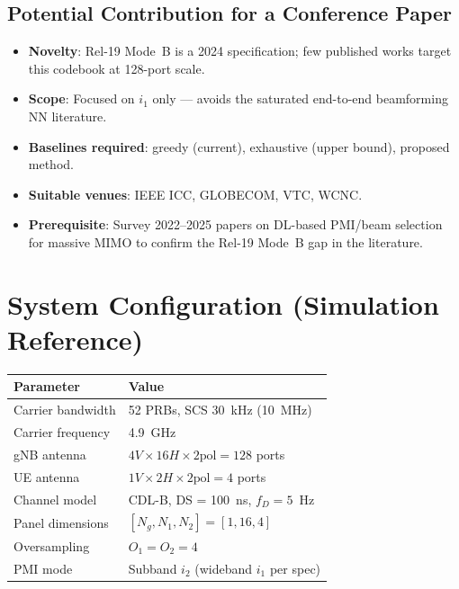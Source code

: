 \documentclass[12pt, a4paper]{article}
\begin{document}
\subsection{Potential Contribution for a Conference Paper}

\begin{itemize}
    \item \textbf{Novelty}: Rel-19 Mode~B is a 2024 specification; few published works
          target this codebook at 128-port scale.
    \item \textbf{Scope}: Focused on $i_1$ only — avoids the saturated end-to-end beamforming NN literature.
    \item \textbf{Baselines required}: greedy (current), exhaustive (upper bound), proposed method.
    \item \textbf{Suitable venues}: IEEE ICC, GLOBECOM, VTC, WCNC.
    \item \textbf{Prerequisite}: Survey 2022--2025 papers on DL-based PMI/beam selection
          for massive MIMO to confirm the Rel-19 Mode~B gap in the literature.
\end{itemize}

\section{System Configuration (Simulation Reference)}

\begin{center}
\begin{tabular}{ll}
\toprule
Parameter & Value \\
\midrule
Carrier bandwidth & 52 PRBs, SCS 30~kHz (10~MHz) \\
Carrier frequency & 4.9~GHz \\
gNB antenna & $4V \times 16H \times 2\text{pol} = 128$ ports \\
UE antenna & $1V \times 2H \times 2\text{pol} = 4$ ports \\
Channel model & CDL-B, DS = 100~ns, $f_D = 5$~Hz \\
Panel dimensions & $[N_g, N_1, N_2] = [1, 16, 4]$ \\
Oversampling & $O_1 = O_2 = 4$ \\
PMI mode & Subband $i_2$ (wideband $i_1$ per spec) \\
\bottomrule
\end{tabular}
\end{center}
\end{document}
